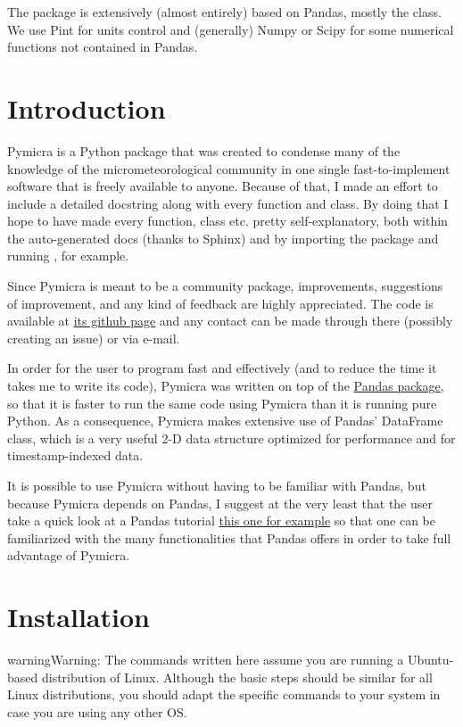 \documentclass[a4paper,10pt,oneside]{sphinxmanual}
\begin{document}
The package is extensively (almost entirely) based on Pandas, mostly the
 class. We use Pint for units control and (generally) Numpy
or Scipy for some numerical functions not contained in Pandas.


\chapter{Introduction}
\label{intro:introduction}\label{intro:pymicra-a-python-tool-for-micrometeorological-analyses}\label{intro:scipy}\label{intro::doc}
Pymicra is a Python package that was created to condense many of the knowledge
of the micrometeorological community in one single fast-to-implement software
that is freely available to anyone. Because of that, I made an effort to
include a detailed docstring along with every function and class. By doing that
I hope to have made every function, class etc. pretty self-explanatory, both
within the auto-generated docs (thanks to Sphinx) and by importing the package
and running , for example.

Since Pymicra is meant to be a community package, improvements, suggestions of
improvement, and any kind of feedback are highly appreciated. The code is
available at \href{https://github.com/tomchor/pymicra}{its github page} and any contact can be made through there
(possibly creating an issue) or via e-mail.

In order for the user to program fast and effectively (and to reduce the time it
takes me to write its code), Pymicra was written on top of the
\href{http://pandas.pydata.org/}{Pandas package}, so that it is faster to run
the same code using Pymicra than it is running pure Python. As a consequence,
Pymicra makes extensive use of Pandas' DataFrame class, which is a very useful
2-D data structure optimized for performance and for timestamp-indexed data.

It is possible to use Pymicra without having to be familiar with Pandas, but
because Pymicra depends on Pandas, I suggest at the very least that the user
take a quick look at a Pandas tutorial
\href{http://pandas.pydata.org/pandas-docs/stable/10min.html}{this one for example}
so that one can be familiarized with the many functionalities that
Pandas offers in order to take full advantage of Pymicra.


\chapter{Installation}
\label{install:installation}\label{install::doc}
\begin{notice}{warning}{Warning:}
The commands written here assume you are running a Ubuntu-based distribution of
Linux. Although the basic steps should be similar for all Linux distributions, you
should adapt the specific commands to your system in case you are using any other OS.
\end{notice}
\end{document}

